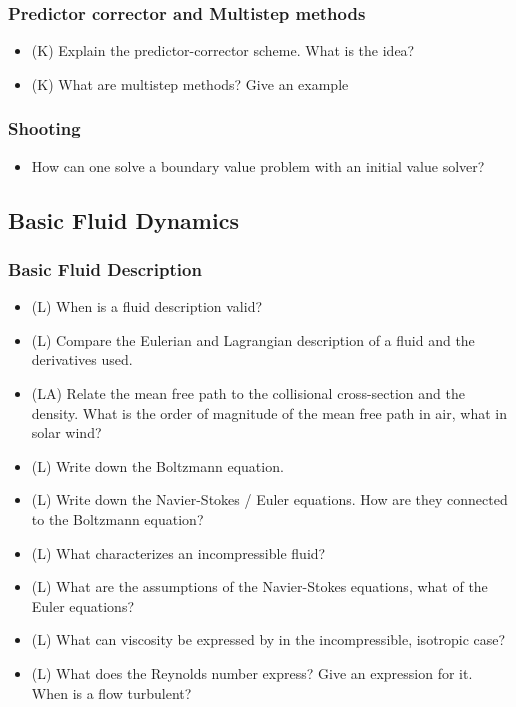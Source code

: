 \subsubsection*{Predictor corrector and Multistep methods}
\begin{itemize}
    \item (K) Explain the predictor-corrector scheme. What is the idea?
    \answerboxM
    \item (K) What are multistep methods? Give an example
    \answerboxM
\end{itemize}

\subsubsection*{Shooting}
\begin{itemize}
    \item How can one solve a boundary value problem with an initial value solver?
    \answerboxM
\end{itemize}

\subsection*{Basic Fluid Dynamics}

\subsubsection*{Basic Fluid Description}
\begin{itemize}
    \item (L) When is a fluid description valid?
    \answerboxS
    \item (L) Compare the Eulerian and Lagrangian description of a fluid and the derivatives used.
    \answerboxM
    \item (LA) Relate the mean free path to the collisional cross-section and the density. What is the order of
    magnitude of the mean free path in air, what in solar wind?
    \answerboxM
    \item (L) Write down the Boltzmann equation.
    \answerboxS
    \item (L) Write down the Navier-Stokes / Euler equations. How are they connected to the Boltzmann equation?
    \answerboxL
    \item (L) What characterizes an incompressible fluid?
    \answerboxM
    \item (L) What are the assumptions of the Navier-Stokes equations, what of the Euler equations?
    \answerboxM
    \item (L) What can viscosity be expressed by in the incompressible, isotropic case?
    \answerboxM
    \item (L) What does the Reynolds number express? Give an expression for it. When is a flow turbulent?
    \answerboxM
\end{itemize}

